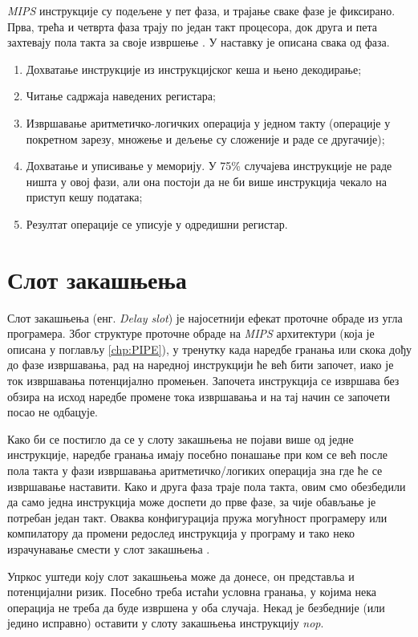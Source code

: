 \documentclass[12pt,oneside]{memoir}
\begin{document}
\textit{MIPS} инструкције су подељене у пет фаза, и трајање сваке фазе је фиксирано. Прва, трећа и четврта фаза
трају по један такт процесора, док друга и пета захтевају пола такта за своје извршење \cite{SMR}. У наставку је
описана свака од фаза.

\begin{enumerate}
	\item Дохватање инструкције из инструкцијског кеша и њено декодирање;
	\item Читање садржаја наведених регистара;
	\item Извршавање аритметичко-логичких операција у једном такту (операције у покретном зарезу, множење и дељење су
	сложеније и раде се другачије);
	\item Дохватање и уписивање у меморију. У 75\% случајева инструкције не раде ништа у овој фази, али она постоји
	да не би више инструкција чекало на приступ кешу података;
	\item Резултат операције се уписује у одредишни регистар.
\end{enumerate}

\section{Слот закашњења} \label{chp:DELAY}

Слот закашњења (енг. \textit{Delay slot}) је најосетнији ефекат проточне обраде из угла програмера. Због структуре
проточне обраде на \textit{MIPS} архитектури (која је описана у поглављу \ref{chp:PIPE}), у тренутку када наредбе
гранања или скока дођу до фазе извршавања, рад на наредној инструкцији ће већ бити започет, иако је ток извршавања
потенцијално промењен. Започета инструкција се извршава без обзира на исход наредбе промене тока извршавања и на тај
начин се започети посао не одбацује.

Како би се постигло да се у слоту закашњења не појави више од једне инструкције, наредбе гранања имају посебно
понашање при ком се већ после пола такта у фази извршавања аритметичко/логиких операција зна где ће се извршавање
наставити. Како и друга фаза траје пола такта, овим смо обезбедили да само једна инструкција може доспети до прве
фазе, за чије обављање је потребан један такт. Оваква конфигурација пружа могућност програмеру или компилатору да
промени редослед инструкција у програму и тако неко израчунавање смести у слот закашњења \cite{SMR}.

Упркос уштеди коју слот закашњења може да донесе, он представља и потенцијални ризик. Посебно треба истаћи условна
гранања, у којима нека операција не треба да буде извршена у оба случаја. Некад је безбедније (или једино исправно)
оставити у слоту закашњења инструкцију \textit{nop}.
\end{document}
